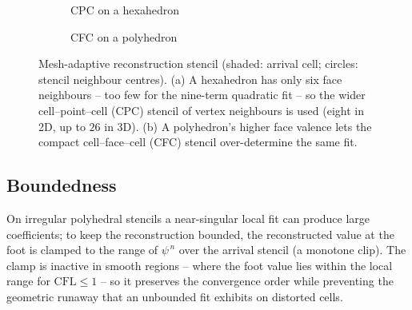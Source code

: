 \documentclass[preprint,3p,11pt]{elsarticle}
\newcommand{\psilev}{\psi}                       %
\begin{document}
\begin{figure}[t]
  \centering
  \begin{subfigure}[b]{0.46\linewidth}
    \centering
    \caption{CPC on a hexahedron}
    \label{fig:stencil-cpc}
  \end{subfigure}\hfill
  \begin{subfigure}[b]{0.46\linewidth}
    \centering
    \caption{CFC on a polyhedron}
    \label{fig:stencil-cfc}
  \end{subfigure}
  \caption{Mesh-adaptive reconstruction stencil (shaded: arrival cell; circles: stencil
  neighbour centres). (a) A hexahedron has only six face neighbours -- too few for the
  nine-term quadratic fit -- so the wider cell--point--cell (CPC) stencil of vertex
  neighbours is used (eight in 2D, up to $26$ in 3D). (b) A polyhedron's higher face
  valence lets the compact cell--face--cell (CFC) stencil over-determine the same fit.}
  \label{fig:stencil2}
\end{figure}

\subsection{Boundedness}
On irregular polyhedral stencils a near-singular local fit can produce large
coefficients; to keep the reconstruction bounded, the reconstructed value at the foot
is clamped to the range of $\psilev^{\,n}$ over the arrival stencil (a monotone clip).
The clamp is inactive in smooth regions -- where the foot value lies within the local
range for $\mathrm{CFL}\!\le\!1$ -- so it preserves the convergence order while
preventing the geometric runaway that an unbounded fit exhibits on distorted cells.
\end{document}
